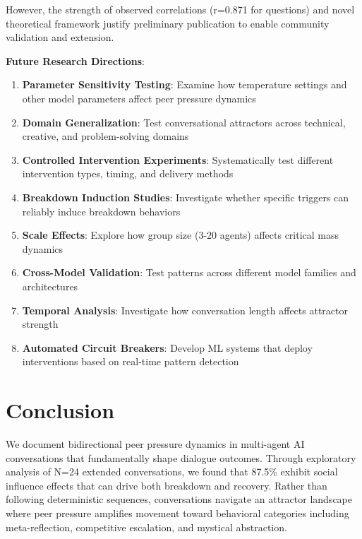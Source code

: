 \documentclass[11pt,letterpaper]{article}
\newcommand{\exponedataTotalSessionsRaw}{24}
\newcommand{\exponedataTotalSessions}{N=\exponedataTotalSessionsRaw}
\newcommand{\exponedataPeerPressurePercentage}{87.5\%}
\newcommand{\exponedataQuestionCorrelation}{0.871}
\begin{document}
However, the strength of observed correlations (r=\exponedataQuestionCorrelation{} for questions) and novel theoretical framework justify preliminary publication to enable community validation and extension.

\textbf{Future Research Directions}:

\begin{enumerate}
    \item \textbf{Parameter Sensitivity Testing}: Examine how temperature settings and other model parameters affect peer pressure dynamics
    \item \textbf{Domain Generalization}: Test conversational attractors across technical, creative, and problem-solving domains
    \item \textbf{Controlled Intervention Experiments}: Systematically test different intervention types, timing, and delivery methods
    \item \textbf{Breakdown Induction Studies}: Investigate whether specific triggers can reliably induce breakdown behaviors
    \item \textbf{Scale Effects}: Explore how group size (3-20 agents) affects critical mass dynamics
    \item \textbf{Cross-Model Validation}: Test patterns across different model families and architectures
    \item \textbf{Temporal Analysis}: Investigate how conversation length affects attractor strength
    \item \textbf{Automated Circuit Breakers}: Develop ML systems that deploy interventions based on real-time pattern detection
\end{enumerate}

\section{Conclusion}

We document bidirectional peer pressure dynamics in multi-agent AI conversations that fundamentally shape dialogue outcomes. Through exploratory analysis of \exponedataTotalSessions{} extended conversations, we found that \exponedataPeerPressurePercentage{} exhibit social influence effects that can drive both breakdown and recovery. Rather than following deterministic sequences, conversations navigate an attractor landscape where peer pressure amplifies movement toward behavioral categories including meta-reflection, competitive escalation, and mystical abstraction.
\end{document}
